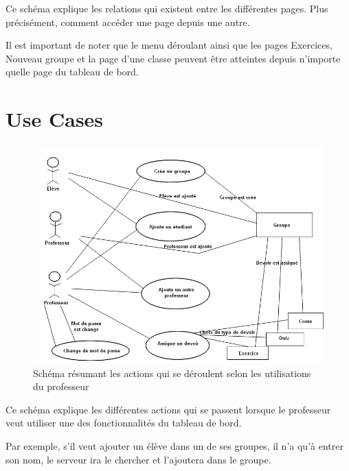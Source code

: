 \documentclass[a4paper,10pt,french]{sphinxmanual}
\begin{document}
Ce schéma explique les relations qui existent entre les différentes pages. Plus
précisément, comment accéder une page depuis une autre.

Il est important de noter que le menu déroulant ainsi que les pages Exercices,
Nouveau groupe et la page d'une classe peuvent être atteintes depuis n'importe
quelle page du tableau de bord.


\section{Use Cases}
\label{documentation:use-cases}\begin{figure}[htbp]
\centering
\capstart

\includegraphics[width=0.600\linewidth]{UseCases.jpg}
\caption{Schéma résumant les actions qui se déroulent selon les utilisations du
professeur}\end{figure}

Ce schéma explique les différentes actions qui se passent lorsque le professeur
veut utiliser une des fonctionnalités du tableau de bord.

Par exemple, s'il veut ajouter un élève dans un de ses groupes, il n'a qu'à
entrer son nom, le serveur ira le chercher et l'ajoutera dans le groupe.
\end{document}
